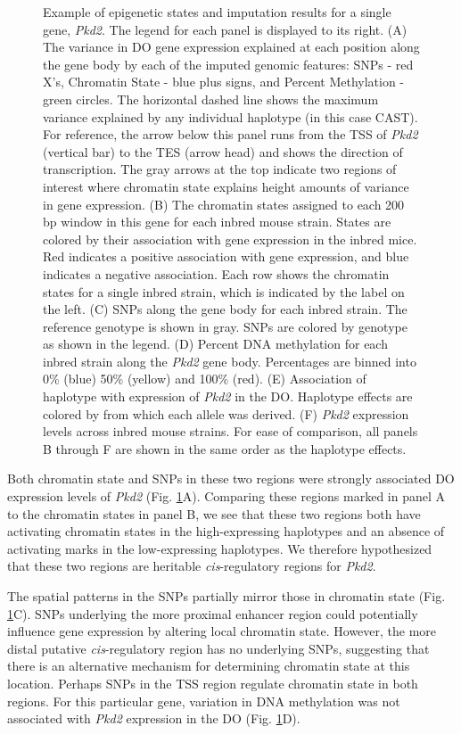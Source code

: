 \documentclass[
  11pt,
]{article}
\begin{document}
\begin{figure}[ht!]
\caption{Example of epigenetic states and imputation results for a single 
gene, \textit{Pkd2}. The legend for each panel is displayed to its right.
(A) The variance in DO gene expression explained at 
each position along the gene body by each of the imputed genomic 
features: SNPs - red X's, Chromatin State - blue plus signs, and 
Percent Methylation - green circles. The horizontal 
dashed line shows the maximum variance explained by any individual 
haplotype (in this case CAST). For reference, the arrow below 
this panel runs from the TSS of \textit{Pkd2} (vertical bar) to the 
TES (arrow head) and shows the direction of transcription. The 
gray arrows at the top indicate two regions of interest where 
chromatin state explains height amounts of variance in gene expression. 
(B) The chromatin states assigned to each 200 bp window in this gene 
for each inbred mouse strain. States are colored by their association 
with gene expression in the inbred mice. Red indicates a positive 
association with gene expression, and blue indicates a negative 
association. Each row shows the chromatin states for a single inbred 
strain, which is indicated by the label on the left. (C) SNPs along 
the gene body for each inbred strain. The reference genotype is shown 
in gray. SNPs are colored by genotype as shown in the legend. (D) Percent 
DNA methylation for each inbred strain along the \textit{Pkd2} gene body. 
Percentages are binned into 0\% (blue) 50\% (yellow) and 100\% (red). (E) 
Association of haplotype with expression of \textit{Pkd2} in the DO. Haplotype 
effects are colored by from which each allele was derived. (F) \textit{Pkd2} 
expression levels across inbred mouse strains. For ease of comparison, 
all panels B through F are shown in the same order as the haplotype effects.}
\label{fig:example_gene}
\end{figure}

Both chromatin state and SNPs in these two regions were strongly
associated DO expression levels of \textit{Pkd2} (Fig.
\ref{fig:example_gene}A). Comparing these regions marked in panel A to
the chromatin states in panel B, we see that these two regions both have
activating chromatin states in the high-expressing haplotypes and an
absence of activating marks in the low-expressing haplotypes. We
therefore hypothesized that these two regions are heritable
\textit{cis}-regulatory regions for \textit{Pkd2}.

The spatial patterns in the SNPs partially mirror those in chromatin
state (Fig. \ref{fig:example_gene}C). SNPs underlying the more proximal
enhancer region could potentially influence gene expression by altering
local chromatin state. However, the more distal putative
\textit{cis}-regulatory region has no underlying SNPs, suggesting that
there is an alternative mechanism for determining chromatin state at
this location. Perhaps SNPs in the TSS region regulate chromatin state
in both regions. For this particular gene, variation in DNA methylation
was not associated with \textit{Pkd2} expression in the DO (Fig.
\ref{fig:example_gene}D).
\end{document}
